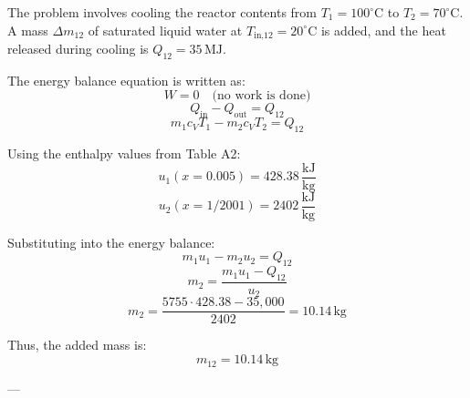 The problem involves cooling the reactor contents from \( T_1 = 100^\circ\text{C} \) to \( T_2 = 70^\circ\text{C} \). A mass \( \Delta m_{12} \) of saturated liquid water at \( T_{\text{in,12}} = 20^\circ\text{C} \) is added, and the heat released during cooling is \( Q_{12} = 35 \, \text{MJ} \).  

The energy balance equation is written as:  
\[
W = 0 \quad \text{(no work is done)}
\]  
\[
Q_{\text{in}} - Q_{\text{out}} = Q_{12}
\]  
\[
m_1 c_V T_1 - m_2 c_V T_2 = Q_{12}
\]  

Using the enthalpy values from Table A2:  
\[
u_1 (x = 0.005) = 428.38 \, \frac{\text{kJ}}{\text{kg}}
\]  
\[
u_2 (x = 1 / 2001) = 2402 \, \frac{\text{kJ}}{\text{kg}}
\]  

Substituting into the energy balance:  
\[
m_1 u_1 - m_2 u_2 = Q_{12}
\]  
\[
m_2 = \frac{m_1 u_1 - Q_{12}}{u_2}
\]  
\[
m_2 = \frac{5755 \cdot 428.38 - 35,000}{2402} = 10.14 \, \text{kg}
\]  

Thus, the added mass is:  
\[
m_{12} = 10.14 \, \text{kg}
\]  

---